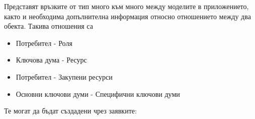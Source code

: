 Представят връзките от тип много към много между
моделите в приложението, както и необходима допълнителна
информация относно отношението между два обекта.
Такива отношения са
\begin{itemize}
    \item Потребител - Роля
    \item Ключова дума - Ресурс
    \item Потребител - Закупени ресурси
    \item Основни ключови думи - Специфични ключови думи
\end{itemize}

Те могат да бъдат създадени чрез заявките:
